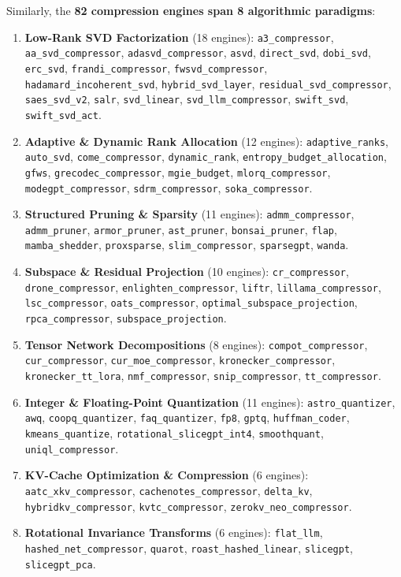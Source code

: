 \documentclass{article}
\begin{document}
Similarly, the \textbf{82 compression engines span 8 algorithmic paradigms}:
\begin{enumerate}
    \item \textbf{Low-Rank SVD Factorization} (18 engines): \texttt{a3\_compressor}, \texttt{aa\_svd\_compressor}, \texttt{adasvd\_compressor}, \texttt{asvd}, \texttt{direct\_svd}, \texttt{dobi\_svd}, \texttt{erc\_svd}, \texttt{frandi\_compressor}, \texttt{fwsvd\_compressor}, \texttt{hadamard\_incoherent\_svd}, \texttt{hybrid\_svd\_layer}, \texttt{residual\_svd\_compressor}, \texttt{saes\_svd\_v2}, \texttt{salr}, \texttt{svd\_linear}, \texttt{svd\_llm\_compressor}, \texttt{swift\_svd}, \texttt{swift\_svd\_act}.
    \item \textbf{Adaptive \& Dynamic Rank Allocation} (12 engines): \texttt{adaptive\_ranks}, \texttt{auto\_svd}, \texttt{come\_compressor}, \texttt{dynamic\_rank}, \texttt{entropy\_budget\_allocation}, \texttt{gfws}, \texttt{grecodec\_compressor}, \texttt{mgie\_budget}, \texttt{mlorq\_compressor}, \texttt{modegpt\_compressor}, \texttt{sdrm\_compressor}, \texttt{soka\_compressor}.
    \item \textbf{Structured Pruning \& Sparsity} (11 engines): \texttt{admm\_compressor}, \texttt{admm\_pruner}, \texttt{armor\_pruner}, \texttt{ast\_pruner}, \texttt{bonsai\_pruner}, \texttt{flap}, \texttt{mamba\_shedder}, \texttt{proxsparse}, \texttt{slim\_compressor}, \texttt{sparsegpt}, \texttt{wanda}.
    \item \textbf{Subspace \& Residual Projection} (10 engines): \texttt{cr\_compressor}, \texttt{drone\_compressor}, \texttt{enlighten\_compressor}, \texttt{liftr}, \texttt{lillama\_compressor}, \texttt{lsc\_compressor}, \texttt{oats\_compressor}, \texttt{optimal\_subspace\_projection}, \texttt{rpca\_compressor}, \texttt{subspace\_projection}.
    \item \textbf{Tensor Network Decompositions} (8 engines): \texttt{compot\_compressor}, \texttt{cur\_compressor}, \texttt{cur\_moe\_compressor}, \texttt{kronecker\_compressor}, \texttt{kronecker\_tt\_lora}, \texttt{nmf\_compressor}, \texttt{snip\_compressor}, \texttt{tt\_compressor}.
    \item \textbf{Integer \& Floating-Point Quantization} (11 engines): \texttt{astro\_quantizer}, \texttt{awq}, \texttt{coopq\_quantizer}, \texttt{faq\_quantizer}, \texttt{fp8}, \texttt{gptq}, \texttt{huffman\_coder}, \texttt{kmeans\_quantize}, \texttt{rotational\_slicegpt\_int4}, \texttt{smoothquant}, \texttt{uniql\_compressor}.
    \item \textbf{KV-Cache Optimization \& Compression} (6 engines): \texttt{aatc\_xkv\_compressor}, \texttt{cachenotes\_compressor}, \texttt{delta\_kv}, \texttt{hybridkv\_compressor}, \texttt{kvtc\_compressor}, \texttt{zerokv\_neo\_compressor}.
    \item \textbf{Rotational Invariance Transforms} (6 engines): \texttt{flat\_llm}, \texttt{hashed\_net\_compressor}, \texttt{quarot}, \texttt{roast\_hashed\_linear}, \texttt{slicegpt}, \texttt{slicegpt\_pca}.
\end{enumerate}
\end{document}
